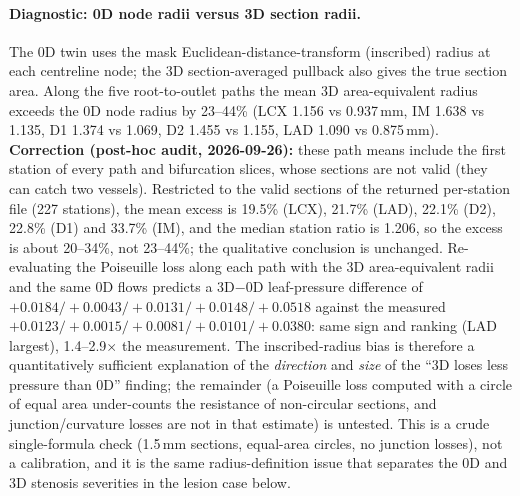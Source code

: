 \documentclass[11pt]{article}
\begin{document}
\paragraph{Diagnostic: 0D node radii versus 3D section radii.} The 0D twin uses the mask Euclidean-distance-transform (inscribed)
radius at each centreline node; the 3D section-averaged pullback also gives the true section area. Along the five
root-to-outlet paths the mean 3D area-equivalent radius exceeds the 0D node radius by 23--44\% (LCX 1.156 vs 0.937\,mm,
IM 1.638 vs 1.135, D1 1.374 vs 1.069, D2 1.455 vs 1.155, LAD 1.090 vs 0.875\,mm). \textbf{Correction (post-hoc audit, 2026-09-26):} these path means include the first station of every path and bifurcation slices, whose sections are not valid (they can catch two vessels). Restricted to the valid sections of the returned per-station file (227 stations), the mean excess is 19.5\% (LCX), 21.7\% (LAD), 22.1\% (D2), 22.8\% (D1) and 33.7\% (IM), and the median station ratio is 1.206, so the excess is about 20--34\%, not 23--44\%; the qualitative conclusion is unchanged. Re-evaluating the Poiseuille loss along each
path with the 3D area-equivalent radii and the same 0D flows predicts a 3D$-$0D leaf-pressure difference of
$+0.0184/+0.0043/+0.0131/+0.0148/+0.0518$ against the measured $+0.0123/+0.0015/+0.0081/+0.0101/+0.0380$: same sign and
ranking (LAD largest), 1.4--2.9$\times$ the measurement. The inscribed-radius bias is therefore a quantitatively sufficient
explanation of the \emph{direction} and \emph{size} of the ``3D loses less pressure than 0D'' finding; the remainder
(a Poiseuille loss computed with a circle of equal area under-counts the resistance of non-circular sections, and
junction/curvature losses are not in that estimate) is untested. This is a crude single-formula check (1.5\,mm sections, equal-area circles, no
junction losses), not a calibration, and it is the same radius-definition issue that separates the 0D and 3D
stenosis severities in the lesion case below.
\end{document}
